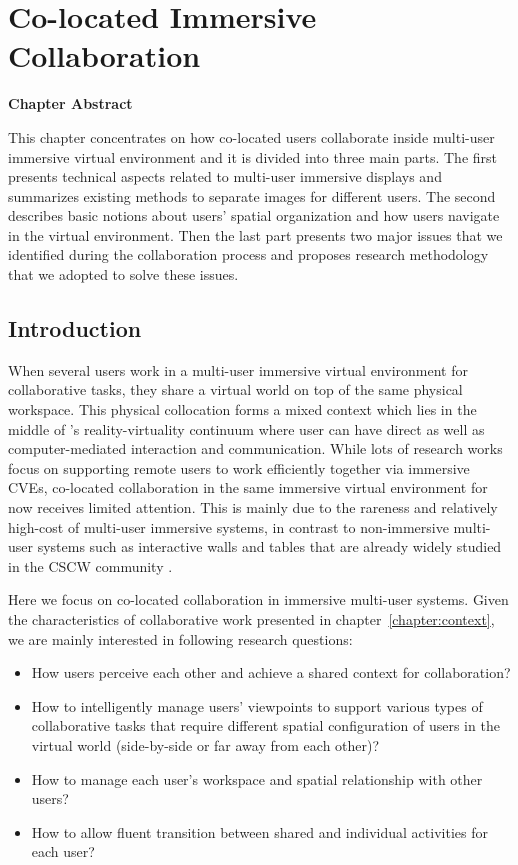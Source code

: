 \chapter{Co-located Immersive Collaboration}
\label{chapter:colocated_colab}
\pagebreak

\textbf{Chapter Abstract}

This chapter concentrates on how co-located users collaborate inside multi-user immersive virtual environment and it is divided into three main parts. The first presents technical aspects related to multi-user immersive displays and summarizes existing methods to separate images for different users. The second describes basic notions about users' spatial organization and how users navigate in the virtual environment. Then the last part presents two major issues that we identified during the collaboration process and proposes research methodology that we adopted to solve these issues.

\vspace*{2\baselineskip}

\minitoc

\newpage
\section{Introduction}
When several users work in a multi-user immersive virtual environment for collaborative tasks, they share a virtual world on top of the same physical workspace. This physical collocation forms a mixed context which lies in the middle of \citet{Milgram1995AR}'s reality-virtuality continuum where user can have direct as well as computer-mediated interaction and communication. While lots of research works focus on supporting remote users to work efficiently together via immersive CVEs, co-located collaboration in the same immersive virtual environment for now receives limited attention. This is mainly due to the rareness and relatively high-cost of multi-user immersive systems, in contrast to non-immersive multi-user systems such as interactive walls and tables that are already widely studied in the CSCW community \citep{Scott2003System, Inkpen2005Exploring}.

Here we focus on co-located collaboration in immersive multi-user systems. Given the characteristics of collaborative work presented in chapter~\ref{chapter:context}, we are mainly interested in following research questions:

\begin{itemize}
\item How users perceive each other and achieve a shared context for collaboration?
\item How to intelligently manage users' viewpoints to support various types of collaborative tasks that require different spatial configuration of users in the virtual world (side-by-side or far away from each other)?
\item How to manage each user's workspace and spatial relationship with other users?
\item How to allow fluent transition between shared and individual activities for each user?
\end{itemize}

